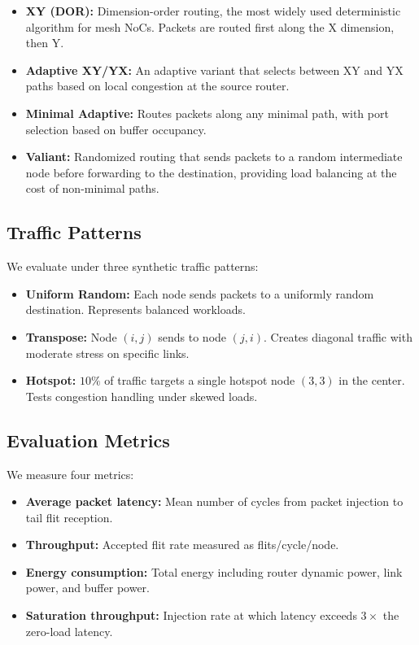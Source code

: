 \begin{itemize}
    \item \textbf{XY (DOR):} Dimension-order routing, the most widely used deterministic algorithm for mesh NoCs. Packets are routed first along the X dimension, then Y.
    \item \textbf{Adaptive XY/YX:} An adaptive variant that selects between XY and YX paths based on local congestion at the source router.
    \item \textbf{Minimal Adaptive:} Routes packets along any minimal path, with port selection based on buffer occupancy.
    \item \textbf{Valiant:} Randomized routing that sends packets to a random intermediate node before forwarding to the destination, providing load balancing at the cost of non-minimal paths.
\end{itemize}

\subsection{Traffic Patterns}

We evaluate under three synthetic traffic patterns:

\begin{itemize}
    \item \textbf{Uniform Random:} Each node sends packets to a uniformly random destination. Represents balanced workloads.
    \item \textbf{Transpose:} Node $(i,j)$ sends to node $(j,i)$. Creates diagonal traffic with moderate stress on specific links.
    \item \textbf{Hotspot:} $10\%$ of traffic targets a single hotspot node $(3,3)$ in the center. Tests congestion handling under skewed loads.
\end{itemize}

\subsection{Evaluation Metrics}

We measure four metrics:

\begin{itemize}
    \item \textbf{Average packet latency:} Mean number of cycles from packet injection to tail flit reception.
    \item \textbf{Throughput:} Accepted flit rate measured as flits/cycle/node.
    \item \textbf{Energy consumption:} Total energy including router dynamic power, link power, and buffer power.
    \item \textbf{Saturation throughput:} Injection rate at which latency exceeds $3\times$ the zero-load latency.
\end{itemize}


